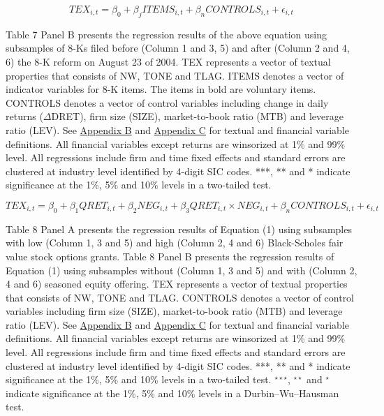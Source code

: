 \newpage


\begin{equation*}
	TEX_{i,t}=\beta_0+\beta_jITEMS_{i,t}+\beta_nCONTROLS_{i,t}+\epsilon_{i,t}
\end{equation*}

Table 7 Panel B presents the regression results of the above equation using subsamples of 8-Ks filed before (Column 1 and 3, 5) and after (Column 2 and 4, 6) the 8-K reform on August 23 of 2004. TEX represents a vector of textual properties that consists of NW, TONE and TLAG. ITEMS denotes a vector of indicator variables for 8-K items. The items in bold are voluntary items. CONTROLS denotes a vector of control variables including change in daily returns ($\Delta$DRET), firm size (SIZE), market-to-book ratio (MTB) and leverage ratio (LEV). See \hyperref[appb]{Appendix B} and \hyperref[appc]{Appendix C} for textual and financial variable definitions. All financial variables except returns are winsorized at 1\% and 99\% level. All regressions include firm and time fixed effects and standard errors are clustered at industry level identified by 4-digit SIC codes. ***, ** and * indicate significance at the 1\%, 5\% and 10\% levels in a two-tailed test. 

\newpage

\setcounter{equation}{0}
\begin{equation}
	TEX_{i,t}=\beta_0+\beta_1QRET_{i,t}+\beta_2NEG_{i,t}+\beta_3QRET_{i,t}\times NEG_{i,t}+\beta_nCONTROLS_{i,t}+\epsilon_{i,t}
\end{equation}

Table 8 Panel A presents the regression results of Equation (1) using subsamples with low (Column 1, 3 and 5) and high (Column 2, 4 and 6) Black-Scholes fair value stock options grants. Table 8 Panel B presents the regression results of Equation (1) using subsamples without (Column 1, 3 and 5) and with (Column 2, 4 and 6) seasoned equity offering. TEX represents a vector of textual properties that consists of NW, TONE and TLAG. CONTROLS denotes a vector of control variables including firm size (SIZE), market-to-book ratio (MTB) and leverage ratio (LEV). See \hyperref[appb]{Appendix B} and \hyperref[appc]{Appendix C} for textual and financial variable definitions. All financial variables except returns are winsorized at 1\% and 99\% level. All regressions include firm and time fixed effects and standard errors are clustered at industry level identified by 4-digit SIC codes. ***, ** and * indicate significance at the 1\%, 5\% and 10\% levels in a two-tailed test. $^{\star\star\star}$, $^{\star\star}$ and $^{\star}$ indicate significance at the 1\%, 5\% and 10\% levels in a Durbin–Wu–Hausman test.